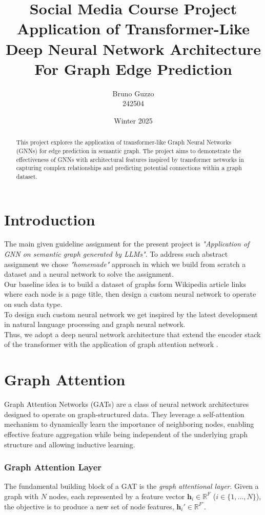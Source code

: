 \documentclass[11pt]{article}
\title{Social Media Course Project \\ [1em] \Large Application of Transformer-Like Deep Neural Network Architecture For Graph Edge Prediction}
\author{Bruno Guzzo \\ 242504}
\date{Winter 2025}
\begin{document}
	
	\maketitle
	
	\begin{abstract}
	This project explores the application of transformer-like Graph Neural Networks (GNNs) for edge prediction in semantic graph. The project aims to demonstrate the effectiveness of GNNs with architectural features inspired by transformer networks in capturing complex relationships and predicting potential connections within a graph dataset.
	\end{abstract}
	
	
	\section{Introduction}
	The main given guideline assignment for the present project is \textit{"Application of GNN on semantic graph generated by LLMs"}. To address such abstract assignment we chose \textit{"homemade"} approach in which we build from scratch a dataset and a neural network to solve the assignment. \\
	Our baseline idea is to build a dataset of graphs form Wikipedia article links where each node is a page title, then design a custom neural network to operate on such data type.\\
	To design such custom neural network we get inspired by the latest development in natural language processing and graph neural network. \\
	Thus, we adopt a deep neural network architecture that extend the encoder stack of the transformer \cite{vaswani2023attentionneed} with the application of graph attention network \cite{veličković2018graphattentionnetworks}.
	
	
	\section{Graph Attention}
	\label{graph_attention}
	Graph Attention Networks (GATs) are a class of neural network architectures designed to operate on graph-structured data. They leverage a self-attention mechanism \cite{vaswani2023attentionneed} to dynamically learn the importance of neighboring nodes, enabling effective feature aggregation while being independent of the underlying graph structure and allowing inductive learning.
	
	\subsubsection{Graph Attention Layer}
	The fundamental building block of a GAT \cite{veličković2018graphattentionnetworks} is the \textit{graph attentional layer}. Given a graph with $N$ nodes, each represented by a feature vector $\mathbf{h}_i \in \mathbb{R}^F$ ($i \in \{1, \dots, N\}$), the objective is to produce a new set of node features, $\mathbf{h}_i' \in \mathbb{R}^{F'}$.
	
\end{document}

